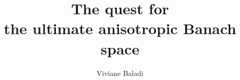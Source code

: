 \documentclass[10pt,twoside]{amsart}
\begin{document}
\newcommand{\comments}[1]{\marginpar{\footnotesize #1}} %


\newtheorem{proposition}{Proposition}[section]
\newtheorem{lemma}[proposition]{Lemma}
\newtheorem{sublemma}[proposition]{Sublemma}
\newtheorem{theorem}[proposition]{Theorem}

\newtheorem{maintheorem}{Main Theorem}
\newtheorem{corollary}[proposition]{Corollary}

\newtheorem{ex}[proposition]{Example}

\theoremstyle{remark}

\newtheorem{remark}[proposition]{Remark}

\theoremstyle{definition}
\newtheorem{definition}[proposition]{Definition}
\newcommand{\ovB}{\bar{B}}
\def\Erg{\mathrm{Erg}\, }
\def\cone{\mathbf{C}} %
\def\real{\mathbb{R}}
\def\sphere{\mathbf{S}^{d-1}}%
\def\integer{\mathbb{Z}}
\def\complex{\mathbb{C}}
\def\BBB{\mathbb{B}}
\def\supp{\mathrm{supp}}
\def\var{\mathrm{var}}
\def\sgn{\mathrm{sgn}}
\def\sp{\mathrm{sp}}
\def\id{\mathrm{id}}
\def\Imm{\mathrm{Image}}
\def\cc{\Subset}
\def\D{\mathrm {d}}
\def\I{i}
\def\E{e}
\def\Lip{\mathrm{Lip}}
\def\BB{\mathcal{B}}
\def\CC{\mathcal{C}}
\def\DD{\mathcal{D}}
\def\EE{\mathcal{E}}
\def\FF{\mathcal{F}}
\def\GG{\mathcal{G}}
\def\II{\mathcal{I}}
\def\JJ{\mathcal{J}}
\def\KK{\mathcal{K}}
\def\LL{\mathcal{L}}
\def\LLL{\mathbb{L}}
\def\MM{\mathcal{M}}
\def\NN{\mathcal{N}}
\def \OO{\mathcal {O}}
\def \PP{\mathcal {P}}
\def \QQ{\mathcal {Q}}
\def \RR{\mathcal {R}}
\def\SS{\mathcal{S}}
\def\TT{\mathcal{T}}
\def\UU{\mathcal{U}}
\def\VV{\mathcal{V}}
\def\YY{\mathcal{Y}}
\def\ZZ{\mathcal{Z}}
\def\FFF{\mathbb{F}}
\def\PPP{\mathbb{P}}




\title[The quest for the ultimate anisotropic space]{The quest for \\the ultimate anisotropic Banach space}

\author{Viviane Baladi} 
\address{Sorbonne Universit\'es, UPMC Univ Paris 06, CNRS, Institut de Math\'ematiques de Jussieu (IMJ-PRG),  4, Place Jussieu, 75005 Paris, France}
\end{document}
